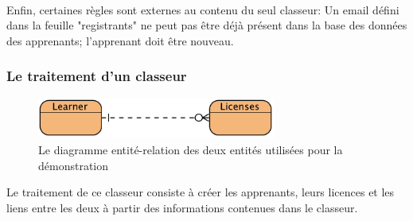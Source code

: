 \paragraph{}
Enfin, certaines règles sont externes au contenu du seul classeur:
Un email défini dans la feuille "registrants" ne peut pas être déjà présent dans la base des données des apprenants; l'apprenant doit être nouveau.

\subsubsection{Le traitement d'un classeur}
\label{subsubsec:spreadsheet-processing-case}

\begin{figure}[ht]
    \centering
    \includegraphics[width=0.7\textwidth]{images/diagrams/entity-relationship.png}
    \caption{Le diagramme entité-relation des deux entités utilisées pour la démonstration}
    \label{fig:entity-relationship}
\end{figure}

Le traitement de ce classeur consiste à créer les apprenants, leurs licences et les liens entre les deux à partir des informations contenues dans le classeur.
